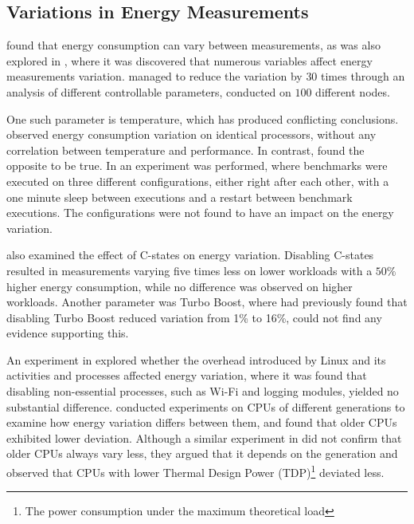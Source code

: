 \subsection{Variations in Energy Measurements}


\cite{biksbois} found that energy consumption can vary between measurements, as was also explored in \cite{Ournani2020}, where it was discovered that numerous variables affect energy measurements variation. \cite{Ournani2020} managed to reduce the variation by $30$ times through an analysis of different controllable parameters, conducted on $100$ different nodes.

One such parameter is temperature, which has produced conflicting conclusions. \cite{Kistowski2016} observed energy consumption variation on identical processors, without any correlation between temperature and performance. In contrast, \cite{Wang2018} found the opposite to be true. In \cite{Ournani2020} an experiment was performed, where benchmarks were executed on three different configurations, either right after each other, with a one minute sleep between executions and a restart between benchmark executions. The configurations were not found to have an impact on the energy variation. 

\cite{Ournani2020} also examined the effect of C-states on energy variation. Disabling C-states resulted in measurements varying five times less on lower workloads with a $50\%$ higher energy consumption, while no difference was observed on higher workloads. Another parameter was Turbo Boost, where \cite{Acun2016} had previously found that disabling Turbo Boost reduced variation from 1\% to 16\%, \cite{Ournani2020} could not find any evidence supporting this.


An experiment in \cite{Ournani2020} explored whether the overhead introduced by Linux and its activities and processes affected energy variation, where it was found that disabling non-essential processes, such as Wi-Fi and logging modules, yielded no substantial difference. \cite{Marathe2017, Wang2019} conducted experiments on CPUs of different generations to examine how energy variation differs between them, and found that older CPUs exhibited lower deviation. Although a similar experiment in \cite{Ournani2020} did not confirm that older CPUs always vary less, they argued that it depends on the generation and observed that CPUs with lower Thermal Design Power (TDP)\footnote{The power consumption under the maximum theoretical load\cite{tdp}} deviated less.


